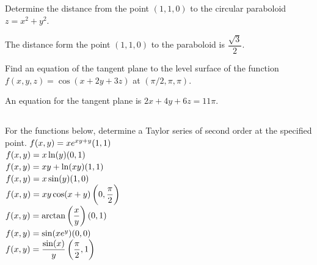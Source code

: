 \begin{Exercise}[difficulty = 3] Determine the distance from the point $(1,1,0)$ to the circular paraboloid $z=x^2+y^2.$ %
\end{Exercise}

\begin{Answer}
The distance form the point $(1,1,0)$ to the paraboloid is $\dfrac{\sqrt{3}}{2}$.
\end{Answer}


\ifanalysis
\begin{Exercise}[difficulty = 3]
Find an equation of the tangent plane to the level surface of the function \\ $f(x,y,z) = \cos (x + 2y + 3z)$ at $\left(\pi/2, \pi, \pi \right)$.
\end{Exercise}

\begin{Answer}
    An equation for the tangent plane is $2x+4y+6z=11\pi$.
\end{Answer}
\fi

\subsection*{}

\begin{Exercise} For the functions below, determine a Taylor series  of second order at the specified point. 
	\Question[difficulty=2] $f(x,y) = x e^{xy+y} \hfill (1,1)\hspace{7cm}$
	\Question[difficulty=1] $f(x,y) = x\ln (y)  \hfill (0,1)\hspace{7cm}$
	\Question[difficulty=2] $f(x,y) = x y + \ln  ( xy ) \hfill (1,1)\hspace{7cm}$
	\Question[difficulty=1] $f(x,y) = x\sin (y)  \hfill (1,0)\hspace{7cm}$
	\Question[difficulty=2] $f(x,y) = xy\cos( x+y ) \hfill \left(0, \dfrac{\pi}{2} \right) \hspace{6.75cm}$
    \ifanalysis	
        \Question[difficulty=2] $f(x,y) = \arctan \left(\dfrac{x}{y} \right) \hfill (0,1)\hspace{7cm}$
    	\Question[difficulty=3] $f(x,y) = \sin (x e^y) \hfill (0,0)\hspace{7cm}$ %
    	\Question[difficulty=2] $f(x,y)= \dfrac{\sin (x)}{y} \hfill \left(\dfrac{\pi}{2},1\right)\hspace{6.75cm}$  %
    \fi
\end{Exercise}

